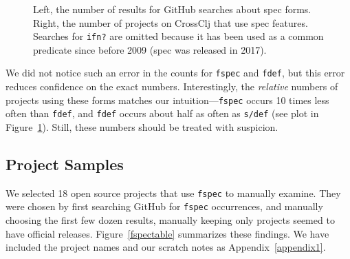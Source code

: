 \begin{figure}
\caption{Left, the number of results for GitHub searches about spec forms.
Right, the number of projects on CrossClj that use spec features.
  Searches for \texttt{ifn?} are omitted because
  it has been used as a common predicate since before 2009 (spec was released in 2017).
  }
  \label{frequencybargraphs}
\end{figure}

We did not notice such an error in the counts for \texttt{fspec} and \texttt{fdef}, but
this error reduces confidence on the exact numbers. Interestingly, the \emph{relative}
numbers of projects using these forms matches our intuition---\texttt{fspec} occurs
10 times less often than \texttt{fdef}, and \texttt{fdef} occurs about half as often as \texttt{s/def}
(see plot in Figure~\ref{frequencybargraphs}).
Still, these numbers should be treated with suspicion.

\subsection{Project Samples}

We selected 18 open source projects that use \texttt{fspec} to manually examine.
They were chosen by first searching GitHub for \texttt{fspec} occurrences, and
manually choosing the first few dozen results, manually keeping only projects
seemed to have official releases.
Figure~\ref{fspectable} summarizes these findings. We have included the project
names and our scratch notes as Appendix~\ref{appendix1}.

